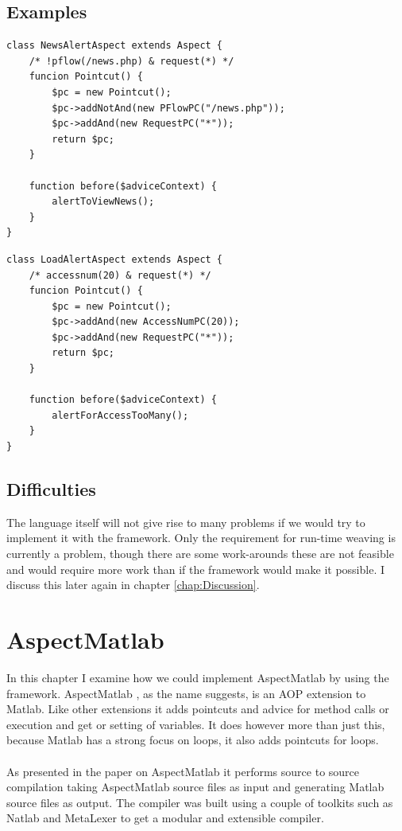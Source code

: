 \documentclass[a4paper]{report}
\begin{document}
\section{Examples}
\begin{lstlisting}[caption=An advice to alert the user to check the newspage.,label=lst:AOWP_ExampleNews]
class NewsAlertAspect extends Aspect {
	/* !pflow(/news.php) & request(*) */	
	funcion Pointcut() {
		$pc = new Pointcut();
		$pc->addNotAnd(new PFlowPC("/news.php"));
		$pc->addAnd(new RequestPC("*"));
		return $pc;
	}
	
	function before($adviceContext) {
		alertToViewNews();
	}
}
\end{lstlisting}
\begin{lstlisting}[caption=An advice that alerts on heavy load.,label=lst:AOWP_ExampleLoad]
class LoadAlertAspect extends Aspect {
	/* accessnum(20) & request(*) */	
	funcion Pointcut() {
		$pc = new Pointcut();
		$pc->addAnd(new AccessNumPC(20));
		$pc->addAnd(new RequestPC("*"));
		return $pc;
	}
	
	function before($adviceContext) {
		alertForAccessTooMany();
	}
}
\end{lstlisting}
\section{Difficulties}
The language itself will not give rise to many problems if we would try to implement it with the framework. Only the requirement for run-time weaving is currently a problem, though there are some work-arounds these are not feasible and would require more work than if the framework would make it possible. I discuss this later again in chapter \ref{chap:Discussion}.

\chapter{AspectMatlab}
\label{chap:AspectMatlab}
In this chapter I examine how we could implement AspectMatlab by using the framework. AspectMatlab \cite{aslam_aspectmatlab:_2010}, as the name suggests, is an AOP extension to Matlab. Like other extensions it adds pointcuts and advice for method calls or execution and get or setting of variables. It does however more than just this, because Matlab has a strong focus on loops, it also adds pointcuts for loops.\\
\\
As presented in the paper on AspectMatlab it performs source to source compilation taking AspectMatlab source files as input and generating Matlab source files as output. The compiler was built using a couple of toolkits such as Natlab and MetaLexer to get a modular and extensible compiler.
\end{document}
